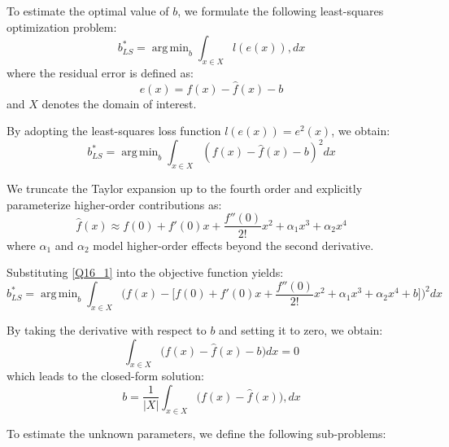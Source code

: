 \documentclass{elsarticle}
\DeclareMathOperator*{\argmin}{arg\,min}
\begin{document}
To estimate the optimal value of $b$, we formulate the following least-squares optimization problem:
\begin{equation}\label{Q14_1}
	b^*_{LS}=\argmin_{b}\int_{x\in X} l(e(x)),dx
\end{equation}
where the residual error is defined as:
\begin{equation}
	e(x)=f(x)-\hat{f}(x)-b
\end{equation}
and $X$ denotes the domain of interest.

By adopting the least-squares loss function $l(e(x)) = e^2(x)$, we obtain:
\begin{equation}\label{Q15_1}
	b^*_{LS}=\argmin_{b}\int_{x\in X}\left(f(x)-\hat{f}(x)-b\right)^2 dx
\end{equation}

We truncate the Taylor expansion up to the fourth order and explicitly parameterize higher-order contributions as:
\begin{equation}\label{Q16_1}
	\hat{f}(x)\approx f(0)+f'(0)x+\frac{f''(0)}{2!}x^2+\alpha_1 x^3+\alpha_2 x^4
\end{equation}
where $\alpha_1$ and $\alpha_2$ model higher-order effects beyond the second derivative.

Substituting \eqref{Q16_1} into the objective function yields:
\begin{equation}\label{Q17_1}
	b^*_{LS}=\argmin_{b}\int_{x\in X}\Big(f(x)-\big[f(0)+f'(0)x+\frac{f''(0)}{2!}x^2+\alpha_1 x^3+\alpha_2 x^4 + b \big]\Big)^2 dx
\end{equation}

By taking the derivative with respect to $b$ and setting it to zero, we obtain:
\begin{equation}\label{Q18_1}
	\int_{x\in X}\Big(f(x)-\hat{f}(x)-b\Big) dx = 0
\end{equation}
which leads to the closed-form solution:
\begin{equation}\label{Q19_1}
	b = \frac{1}{|X|}\int_{x\in X} \big(f(x)-\hat{f}(x)\big),dx
\end{equation}

To estimate the unknown parameters, we define the following sub-problems:
\end{document}
